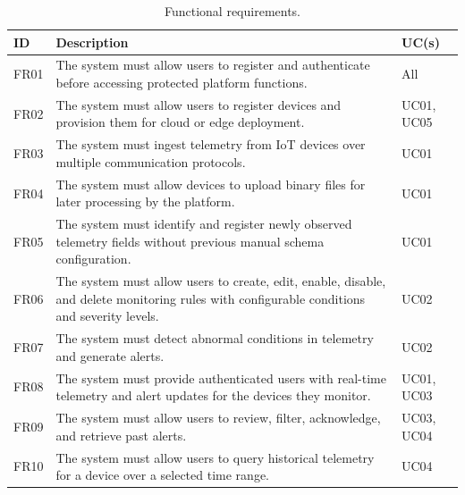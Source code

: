 \begin{table}[H]
    \centering
    \caption{Functional requirements.}
    \label{tab:functional-requirements}
    \small
    \begin{tabularx}{\textwidth}{l X l}
        \toprule
        \textbf{ID} & \textbf{Description}                                                                                                                        & \textbf{UC(s)} \\
        \midrule
        FR01        & The system must allow users to register and authenticate before accessing protected platform functions.                                     & All            \\
        FR02        & The system must allow users to register devices and provision them for cloud or edge deployment.                                            & UC01, UC05     \\
        FR03        & The system must ingest telemetry from \gls{IoT} devices over multiple communication protocols.                                              & UC01           \\
        FR04        & The system must allow devices to upload binary files for later processing by the platform.                                                  & UC01           \\
        FR05        & The system must identify and register newly observed telemetry fields without previous manual schema configuration.                         & UC01           \\
        FR06        & The system must allow users to create, edit, enable, disable, and delete monitoring rules with configurable conditions and severity levels. & UC02           \\
        FR07        & The system must detect abnormal conditions in telemetry and generate alerts.                                                                & UC02           \\
        FR08        & The system must provide authenticated users with real-time telemetry and alert updates for the devices they monitor.                        & UC01, UC03     \\
        FR09        & The system must allow users to review, filter, acknowledge, and retrieve past alerts.                                                       & UC03, UC04     \\
        FR10        & The system must allow users to query historical telemetry for a device over a selected time range.                                          & UC04           \\

\end{tabularx}
\end{table}
